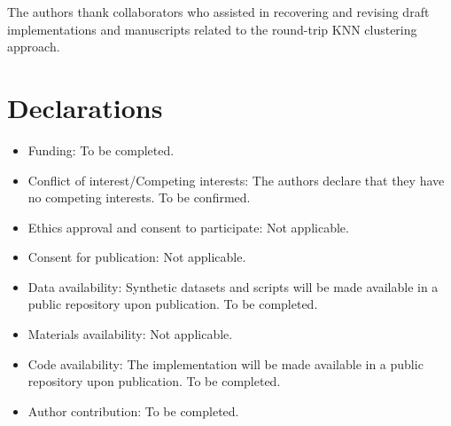 \documentclass[pdflatex,sn-mathphys-num]{sn-jnl}
\begin{document}
\backmatter


The authors thank collaborators who assisted in recovering and revising draft implementations and manuscripts related to the round-trip KNN clustering approach.

\section*{Declarations}

\begin{itemize}
\item Funding: To be completed.
\item Conflict of interest/Competing interests: The authors declare that they have no competing interests. To be confirmed.
\item Ethics approval and consent to participate: Not applicable.
\item Consent for publication: Not applicable.
\item Data availability: Synthetic datasets and scripts will be made available in a public repository upon publication. To be completed.
\item Materials availability: Not applicable.
\item Code availability: The implementation will be made available in a public repository upon publication. To be completed.
\item Author contribution: To be completed.
\end{itemize}


\end{document}
